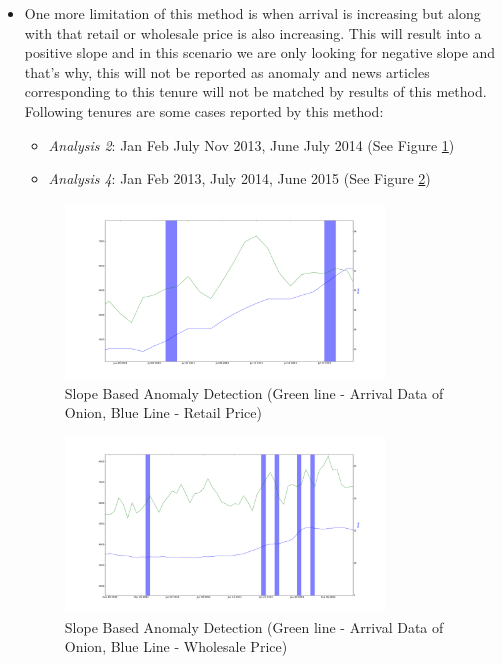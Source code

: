 \begin{itemize}
			\item One more limitation of this method is when arrival is increasing but along with that retail or wholesale price is also increasing. This will result into a positive slope and in this scenario we are only looking for negative slope and that's why, this will not be reported as anomaly and news articles corresponding to this tenure will not be matched by results of this method.\\		
			
			Following tenures are some cases reported by this method:
			\begin{itemize}
				\item \textit{Analysis 2}: Jan Feb July Nov 2013, June July 2014 (See Figure \ref{fig:12123})
				\item \textit{Analysis 4}: Jan Feb 2013, July 2014, June 2015 (See Figure \ref{fig:12143})
			\end{itemize}
			
			\begin{figure}[H]
		    	\centering
  		    	\includegraphics[width=0.8\textwidth]{graphs/12123.png}
		    	\caption{Slope Based Anomaly Detection (Green line - Arrival Data of Onion, Blue Line - Retail Price)}
		    	\label{fig:12123}
			\end{figure}
			
			\begin{figure}[H]
		    	\centering
  		    	\includegraphics[width=0.8\textwidth]{graphs/12143.png}
		    	\caption{Slope Based Anomaly Detection (Green line - Arrival Data of Onion, Blue Line - Wholesale Price)}
		    	\label{fig:12143}
			\end{figure}
			

\end{itemize}
